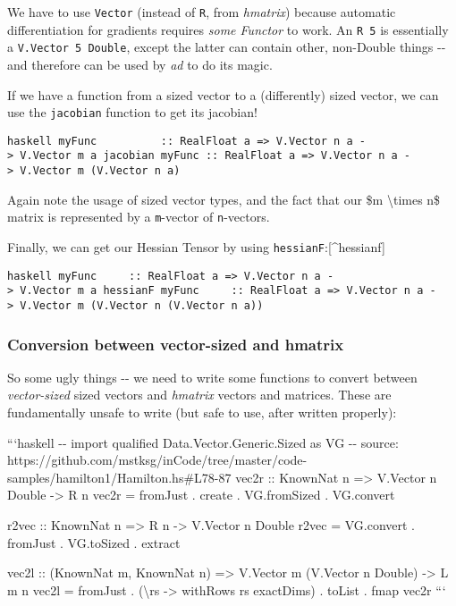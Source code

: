 \documentclass[]{article}
\begin{document}
We have to use \texttt{Vector} (instead of \texttt{R}, from \emph{hmatrix})
because automatic differentiation for gradients requires \emph{some Functor} to
work. An \texttt{R\ 5} is essentially a \texttt{V.Vector\ 5\ Double}, except the
latter can contain other, non-Double things -\/- and therefore can be used by
\emph{ad} to do its magic.

If we have a function from a sized vector to a (differently) sized vector, we
can use the \texttt{jacobian} function to get its jacobian!

\texttt{haskell\ myFunc\ \ \ \ \ \ \ \ \ \ ::\ RealFloat\ a\ =\textgreater{}\ V.Vector\ n\ a\ -\textgreater{}\ V.Vector\ m\ a\ jacobian\ myFunc\ ::\ RealFloat\ a\ =\textgreater{}\ V.Vector\ n\ a\ -\textgreater{}\ V.Vector\ m\ (V.Vector\ n\ a)}

Again note the usage of sized vector types, and the fact that our \$m
\textbackslash{}times n\$ matrix is represented by a \texttt{m}-vector of
\texttt{n}-vectors.

Finally, we can get our Hessian Tensor by using
\texttt{hessianF}:{[}\^{}hessianf{]}

\texttt{haskell\ myFunc\ \ \ \ \ ::\ RealFloat\ a\ =\textgreater{}\ V.Vector\ n\ a\ -\textgreater{}\ V.Vector\ m\ a\ hessianF\ myFunc\ \ \ \ \ ::\ RealFloat\ a\ =\textgreater{}\ V.Vector\ n\ a\ -\textgreater{}\ V.Vector\ m\ (V.Vector\ n\ (V.Vector\ n\ a))}

\subsubsection{Conversion between vector-sized and hmatrix}

So some ugly things -\/- we need to write some functions to convert between
\emph{vector-sized} sized vectors and \emph{hmatrix} vectors and matrices. These
are fundamentally unsafe to write (but safe to use, after written properly):

```haskell -\/- import qualified Data.Vector.Generic.Sized as VG -\/- source:
https://github.com/mstksg/inCode/tree/master/code-samples/hamilton1/Hamilton.hs\#L78-87
vec2r :: KnownNat n =\textgreater{} V.Vector n Double -\textgreater{} R n vec2r
= fromJust . create . VG.fromSized . VG.convert

r2vec :: KnownNat n =\textgreater{} R n -\textgreater{} V.Vector n Double r2vec
= VG.convert . fromJust . VG.toSized . extract

vec2l :: (KnownNat m, KnownNat n) =\textgreater{} V.Vector m (V.Vector n Double)
-\textgreater{} L m n vec2l = fromJust . (\textbackslash{}rs -\textgreater{}
withRows rs exactDims) . toList . fmap vec2r ```
\end{document}
